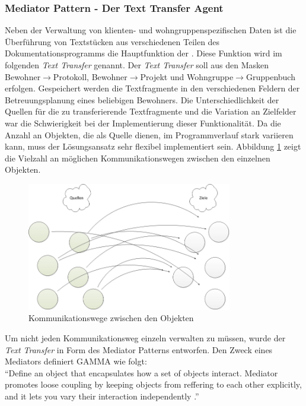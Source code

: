 \subsubsection{Mediator Pattern - Der Text Transfer Agent}
Neben der Verwaltung von klienten- und wohngruppenspezifischen Daten ist die Überführung von Textstücken aus verschiedenen Teilen des
Dokumentationsprogramms die Hauptfunktion der \EBP. Diese Funktion wird im folgenden \textit{Text Transfer} genannt. \newline
Der \textit{Text Transfer} soll aus den Masken Bewohner$\rightarrow$Protokoll, Bewohner$\rightarrow$Projekt und Wohngruppe$\rightarrow$Gruppenbuch
erfolgen. Gespeichert werden die Textfragmente in den verschiedenen Feldern der Betreuungsplanung eines beliebigen Bewohners. Die Unterschiedlichkeit
der Quellen für die zu transferierende Textfragmente und die Variation an Zielfelder war die Schwierigkeit bei der Implementierung dieser
Funktionalität. Da die Anzahl an Objekten, die als Quelle dienen, im Programmverlauf stark variieren kann, muss der Lösungsansatz sehr flexibel
implementiert sein. Abbildung \ref{unstrukturiert} zeigt die Vielzahl an möglichen Kommunikationswegen zwischen den einzelnen Objekten.\\
\begin{figure}[htp!]
	\includegraphics[width=0.8\textwidth]{unmediated}
	\caption{Kommunikationswege zwischen den Objekten}
	\label{unstrukturiert}
\end{figure}
Um nicht jeden Kommunikationsweg einzeln verwalten zu müssen, wurde der \textit{Text Transfer} in Form des Mediator Patterns entworfen. Den Zweck
eines Mediators definiert GAMMA wie folgt: \\
``Define an object that encapsulates how a set of objects interact. Mediator promotes loose coupling by keeping objects from reffering to each other explicitly, 
and it lets you vary their interaction independently \cite[S. 273]{Entwurfsmuster}.''\\
